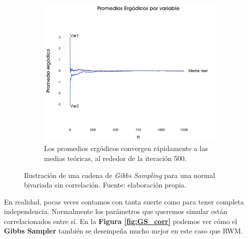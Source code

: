\begin{figure}[h]
\begin{subfigure}{0.3\textwidth}
    \end{subfigure}
    ~
    \begin{subfigure}{0.3\textwidth}
        \includegraphics[width=\textwidth]{Figs/Bayes/Ejemplo_GS_C}
        \caption{Los promedios ergódicos convergen rápidamente a las medias teóricas, al rededor de la iteración 500. }
     \end{subfigure}
     \caption{Ilustración de una cadena de \textit{Gibbs Sampling} para una normal bivariada sin correlación. Fuente: elaboración propia.}\label{fig:GS_indep}
\end{figure}
 
En realidad, pocas veces contamos con tanta suerte como para tener completa independencia. Normalmente los parámetros que queremos simular están correlacionados entre sí. En la \textbf{Figura \ref{fig:GS_corr}} podemos ver cómo el \textbf{Gibbs Sampler} también se desempeña mucho mejor en este caso que RWM.\\
 

